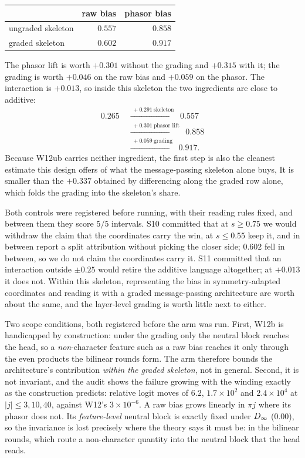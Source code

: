 \begin{center}\small
\begin{tabular}{@{}lrr@{}}
\toprule
 & raw bias & phasor bias \\
\midrule
ungraded skeleton & $0.557$ & $0.858$ \\
graded skeleton   & $0.602$ & $0.917$ \\
\bottomrule
\end{tabular}
\end{center}

\noindent The phasor lift is worth $+0.301$ without the grading and $+0.315$ with it; the grading is
worth $+0.046$ on the raw bias and $+0.059$ on the phasor. The interaction is $\mathbf{+0.013}$, so
inside this skeleton the two ingredients are close to additive:
\[
\begin{aligned}
0.265 &\;\xrightarrow{\;+0.291\ \text{skeleton}\;}\; 0.557\\
&\;\xrightarrow{\;+0.301\ \text{phasor lift}\;}\; 0.858\\
&\;\xrightarrow{\;+0.059\ \text{grading}\;}\; 0.917 .
\end{aligned}
\]
Because W12ub carries neither ingredient, the first step is also the cleanest estimate this design
offers of what the message-passing skeleton alone buys, It is smaller than the $+0.337$ obtained by differencing
along the graded row alone, which folds the grading into the skeleton's share.

Both controls were registered before running, with their reading rules fixed, and between them they
score $5/5$ intervals. S10 committed that at $s \ge 0.75$ we would withdraw the claim that the
coordinates carry the win, at $s \le 0.55$ keep it, and in between report a split attribution
without picking the closer side; $0.602$ fell in between, so we do not claim the coordinates carry
it. S11 committed that an interaction outside $\pm0.25$ would retire the additive language
altogether; at $+0.013$ it does not. Within this skeleton, representing the bias in
symmetry-adapted coordinates and reading it with a graded message-passing architecture are worth
about the same, and the layer-level grading is worth little next to either.

Two scope conditions, both registered before the arm was run. First, W12b is handicapped by
construction: under the grading only the neutral block reaches the head, so a \emph{non}-character
feature such as a raw bias reaches it only through the even products the bilinear rounds form. The
arm therefore bounds the architecture's contribution \emph{within the graded skeleton}, not in
general. Second, it is not invariant, and the audit shows the failure growing with the winding exactly as
the construction predicts: relative logit moves of $6.2$, $1.7\times10^2$ and $2.4\times10^4$ at
$|j| \le 3, 10, 40$, against W12's $3\times10^{-6}$. A raw bias grows linearly in $\pi j$ where its
phasor does not. Its \emph{feature-level} neutral block is exactly
fixed under $D_\infty$ ($0.00$), so the invariance is lost precisely where the theory says it must be:
in the bilinear rounds, which route a non-character quantity into the neutral block that the head
reads.

